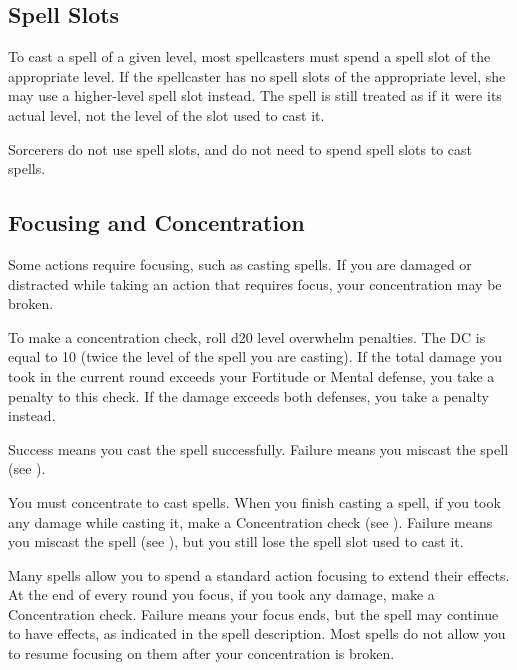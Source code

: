 \subsection{Spell Slots}
To cast a spell of a given level, most spellcasters must spend a spell slot of the appropriate level. If the spellcaster has no spell slots of the appropriate level, she may use a higher-level spell slot instead. The spell is still treated as if it were its actual level, not the level of the slot used to cast it.

Sorcerers do not use spell slots, and do not need to spend spell slots to cast spells.

\subsection{Focusing and Concentration}\label{Concentration}\label{Focus}\label{Focusing and Concentration}

Some actions require focusing, such as casting spells.
If you are damaged or distracted while taking an action that requires focus, your concentration may be broken.

\label{Concentration Checks}

To make a concentration check, roll d20 \add level \minus overwhelm penalties.
The DC is equal to 10 \add (twice the level of the spell you are casting).
If the total damage you took in the current round exceeds your Fortitude or Mental defense, you take a  penalty to this check.
If the damage exceeds both defenses, you take a  penalty instead.

Success means you cast the spell successfully.
Failure means you miscast the spell (see ).

 You must concentrate to cast spells. When you finish casting a spell, if you took any damage while casting it, make a Concentration check (see ). Failure means you miscast the spell (see ), but you still lose the spell slot used to cast it.

 Many spells allow you to spend a standard action focusing to extend their effects. At the end of every round you focus, if you took any damage, make a Concentration check. Failure means your focus ends, but the spell may continue to have effects, as indicated in the spell description. Most spells do not allow you to resume focusing on them after your concentration is broken.

